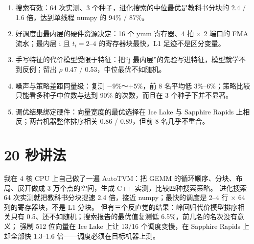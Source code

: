 \documentclass[11pt,a4paper]{ctexart}
\begin{document}
\begin{findingbox}[：五条主要结论]
\begin{enumerate}[label=(\alph*)]
  \item 搜索有效：64 次实测、3 个种子，进化搜索的中位最优是教科书分块的 2.4 / 1.6 倍，达到单线程 numpy 的 94\% / 87\%。
  \item 好调度由最内层的硬件资源决定：16 个 ymm 寄存器、4 拍 × 2 端口的 FMA 流水；最内层 i 且 $t_i=2$--$4$ 的寄存器块最快，L1 足迹不是区分变量。
  \item 手写特征的代价模型受限于特征：把“j 最内层”的先验写进特征，模型就学不到反例；留出 $\rho$ 0.47 / 0.53，中位最优不如随机。
  \item 噪声与策略差距同量级：复测 $-9\%$～$+5\%$，前 8 名平均低 3\%--6\%；策略比较只能看多种子中位数与达到 90\% 的次数，而且在 3 个种子下并不显著。
  \item 调优结果绑定硬件：向量宽度的最优选择在 Ice Lake 与 Sapphire Rapids 上相反；两台机器整体排序相关 0.86 / 0.89，但前 8 名几乎不重合。
\end{enumerate}
\end{findingbox}

\section{20 秒讲法}

我在 4 核 CPU 上自己做了一遍 AutoTVM：把 GEMM 的循环顺序、分块、布局、展开做成 3 万个点的空间，生成 C++ 实测，比较四种搜索策略。
进化搜索 64 次实测就把教科书分块提速 2.4 倍，接近 numpy；最快的调度是 2--4 行 × 64 列的寄存器块，不是 L1 分块。
但有三个反直觉的结果：岭回归代价模型排序相关只有 0.5、还不如随机；搜索报告的最优值复测低 6.5\%，前几名的名次没有意义；
强制 512 位向量在 Ice Lake 上让 13/16 个调度变慢，在 Sapphire Rapids 上却全部快 1.3--1.6 倍——调度必须在目标机器上测。
\end{document}
